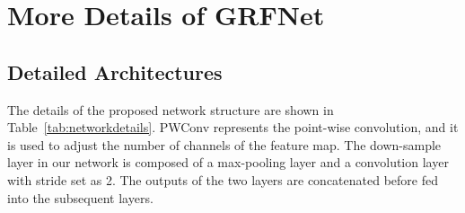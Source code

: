 \documentclass[10pt,twocolumn,letterpaper]{article}
\begin{document}
{\small


}



\section{More Details of GRFNet}
\subsection{Detailed Architectures}
The details of the proposed network structure are shown in Table~\ref{tab:networkdetails}. 
PWConv represents the point-wise convolution, and it is used to adjust the number of channels of the feature map.
The down-sample layer in our network is composed of a max-pooling layer and a convolution layer with stride set as 2. The outputs of the two layers are concatenated before fed into the subsequent layers.
\end{document}
